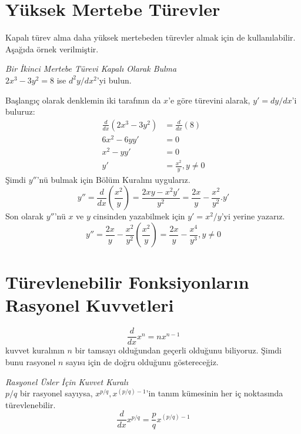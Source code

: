 \section{\protect Yüksek Mertebe Türevler}
Kapalı türev alma daha yüksek mertebeden türevler almak için de kullanılabilir. Aşağıda örnek verilmiştir.
\begin{ornek}\textit{Bir İkinci Mertebe Türevi Kapalı Olarak Bulma}\\

	$2x^3-3y^2=8$ ise $d^2y/dx^2$'yi bulun.
\end{ornek}

\begin{cozum} Başlangıç olarak denklemin iki tarafının da $x$'e göre türevini alarak, $y'=dy/dx$'i buluruz:
	\begin{equation*}
	\begin{split}
	\frac{d}{dx}(2x^3-3y^2)&=\frac{d}{dx}(8)\\
	6x^2-6yy'&=0\\
	x^2-yy'&=0\\
	y'&=\frac{x^2}{y}, y \ne 0
	\end{split}
	\end{equation*}
Şimdi $y''$'nü bulmak için Bölüm Kuralını uygularız.
	\begin{equation*}
	y''=\frac{d}{dx}\left(\frac{x^2}{y}\right)=\frac{2xy-x^2y'}{y^2}=\frac{2x}{y}-\frac{x^2}{y^2}.y'
	\end{equation*}
Son olarak $y''$'nü $x$ ve $y$ cinsinden yazabilmek için $y' = x^2/y$'yi yerine yazarız.
	\begin{equation*}
	y''=\frac{2x}{y}-\frac{x^2}{y^2}\left(\frac{x^2}{y}\right)=\frac{2x}{y}-\frac{x^4}{y^3}, y\ne0
	\end{equation*}
\end{cozum}

\section{\protect Türevlenebilir Fonksiyonların Rasyonel Kuvvetleri}
	\begin{equation*}
	\frac{d}{dx}x^n=nx^{n-1}
	\end{equation*}
kuvvet kuralının $n$ bir tamsayı olduğundan geçerli olduğunu biliyoruz. Şimdi bunu rasyonel $n$ sayısı için de doğru olduğunu göstereceğiz.

\begin{teorem}\textit{Rasyonel Üsler İçin Kuvvet Kuralı}\\
	$p/q$ bir rasyonel sayıysa, $x^{p/q},x^{(p/q)-1}$'in tanım kümesinin her iç noktasında türevlenebilir.
	\begin{equation*}
	\frac{d}{dx}x^{p/q}= \frac{p}{q}x^{(p/q)-1}
	\end{equation*}
\end{teorem}

